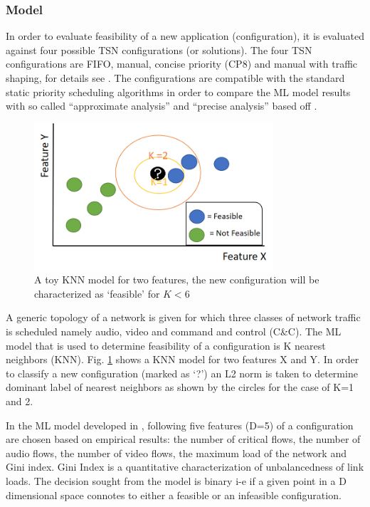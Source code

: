 \documentclass[journal,12pt,twocolumn]{IEEEtran}
\begin{document}
\subsubsection{Model}
In order to evaluate feasibility of a new application (configuration), it is evaluated against four possible TSN configurations (or solutions). The four TSN configurations are FIFO, manual, concise priority (CP8) and manual with traffic shaping, for details see \cite{ML}. The configurations are compatible with the standard static priority scheduling algorithms in order to compare the ML model results with so called “approximate analysis” and “precise analysis'' based off  \cite{8,9,37}.
\begin{figure}
\centering
\includegraphics[width=3.5in]{KNN}
\caption{A toy KNN model for two features, the new configuration will be characterized as `feasible' for $K<6$}
\label{KNN}
\end{figure}

A generic topology of a network is given for which three classes of network traffic is scheduled namely audio, video and command and control (C\&C). The ML model that is used to determine feasibility of a configuration is K nearest neighbors (KNN). Fig. \ref{KNN} shows a KNN model for two features X and Y. In order to classify a new configuration (marked as `?') an L2 norm is taken to determine dominant label of nearest neighbors as shown by the circles for the case of K=1 and 2.

In the ML model developed in \cite{ML}, following five features (D=5) of a configuration are chosen based on empirical results: the number of critical flows, the number of audio flows, the number of video flows, the maximum load of the network and Gini index. Gini Index \cite{GINI} is a quantitative characterization of unbalancedness of link loads. The decision sought from the model is binary i-e if a given point in a D dimensional space connotes to either a feasible or an infeasible configuration.
\end{document}
